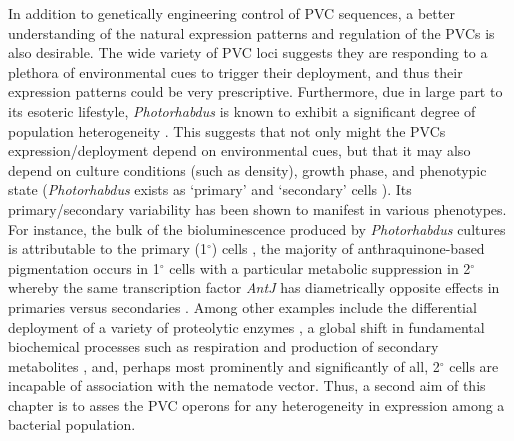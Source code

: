 In addition to genetically engineering control of PVC sequences, a better understanding of the natural expression patterns and regulation of the PVCs is also desirable. The wide variety of PVC loci suggests they are responding to a plethora of environmental cues to trigger their deployment, and thus their expression patterns could be very prescriptive. Furthermore, due in large part to its esoteric lifestyle, \emph{Photorhabdus} is known to exhibit a significant degree of population heterogeneity \citep{Langer2017,Heinrich2016}. This suggests that not only might the PVCs expression/deployment depend on environmental cues, but that it may also depend on culture conditions (such as density), growth phase, and phenotypic state (\emph{Photorhabdus} exists as `primary' and `secondary' cells \citep{Boemare1988}). Its primary/secondary variability has been shown to manifest in various phenotypes. For instance, the bulk of the bioluminescence produced by \emph{Photorhabdus} cultures is attributable to the primary (1$^{\circ}$) cells \citep{Boemare1988, AKHURST1980}, the majority of anthraquinone-based pigmentation occurs in 1$^{\circ}$ cells  with a particular metabolic suppression in 2$^{\circ}$ whereby the same transcription factor \emph{AntJ} has diametrically opposite effects in primaries versus secondaries \citep{Heinrich2016, Langer2017}. Among other examples include the differential deployment of a variety of proteolytic enzymes \citep{Marokhazi2004}, a global shift in fundamental biochemical processes such as respiration \citep{Smigielski1994} and production of secondary metabolites \citep{Turlin2006}, and, perhaps most prominently and significantly of all, 2$^{\circ}$ cells are incapable of association with the nematode vector. Thus, a second aim of this chapter is to asses the PVC operons for any heterogeneity in expression among a bacterial population.

